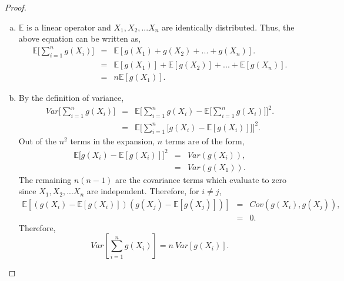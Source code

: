 \documentclass[a4paper,english,12pt]{article}
\begin{document}
\begin{proof}
\begin{enumerate}[a)]
\item{
$\mathbb{E}$ is a linear operator and $X_1, X_2, ... X_n$ are identically distributed. Thus, the above equation can be written as,
\begin{eqnarray}
\mathbb{E}\Big[ \sum_{i=1}^{n} g(X_i) \Big] &=& \mathbb{E}[ g(X_1) + g(X_2) + ... + g(X_n) ].\nonumber \\
&=& \mathbb{E}[g(X_1)] + \mathbb{E}[g(X_2)] + ... + \mathbb{E}[g(X_n)].\nonumber \\
&=& n \mathbb{E}[g(X_1)].
\end{eqnarray}
}
\item{By the definition of variance,}
\begin{eqnarray}
Var\Big[ \sum_{i=1}^{n} g(X_i) \Big] &=& \mathbb{E} \Bigg[ \sum_{i=1}^{n} g(X_i) - \mathbb{E} \Big[ \sum_{i=1}^{n} g(X_i)\Big] \Bigg]^2. \nonumber \\
&=& \mathbb{E} \Bigg[ \sum_{i=1}^{n} \Big[ g(X_i) - \mathbb{E}[ g(X_i)]\Big] \Bigg]^2.
\end{eqnarray}
Out of the $n ^2$ terms in the expansion, $n$ terms are of the form,
\begin{eqnarray}
\mathbb{E}\Big[ g(X_i) - \mathbb{E}[ g(X_i)]\Big]^2 &=& Var (g(X_i)),\nonumber \\
&=& Var(g(X_1)). 
\end{eqnarray}
The remaining $n(n-1)$ are the covariance terms which evaluate to zero since $X_1, X_2,...X_n$ are independent. Therefore, for $i \neq j$,
\begin{eqnarray}
\mathbb{E}\left[(g(X_i) - \mathbb{E}[ g(X_i)])(g(X_j) - \mathbb{E}[ g(X_j)])\right] &=& Cov(g(X_i), g(X_j)), \nonumber \\
&=& 0.
\end{eqnarray}
Therefore,
\begin{equation}
Var \left[ \sum_{i=1}^{n} g(X_i) \right] = n~Var[g(X_i)].
\end{equation}
\end{enumerate}
\end{proof}
\end{document}
